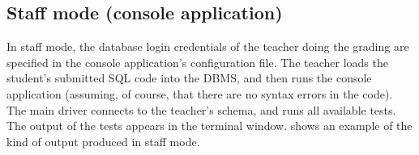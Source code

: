 \documentclass[sigconf, authordraft, capitalise]{acmart}
\begin{document}
\subsection{Staff mode (console application)}

In staff mode, the database login credentials of the teacher doing the grading are specified in the console application's configuration file. The teacher loads the student's submitted SQL code into the DBMS, and then runs the console application (assuming, of course, that there are no syntax errors in the code). The main driver connects to the teacher's schema, and runs all available tests. The output of the tests appears in the terminal window.  shows an example of the kind of output produced in staff mode.

\newlength{\dothskip}
\setlength{\dothskip}{0.72cm}
\newlength{\dotvskip}
\setlength{\dotvskip}{-1.25ex}
\newlength{\codeskip}
\setlength{\codeskip}{-0.5ex}
\end{document}
